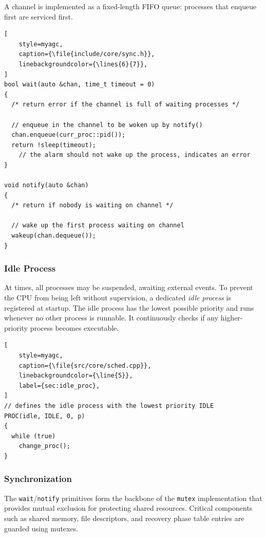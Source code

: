 \begin{itemize}[left=0pt]
        A channel is implemented as a fixed-length FIFO queue: processes that enqueue
        first are serviced first.

\begin{lstlisting}[
    style=myagc,
    caption={\file{include/core/sync.h}},
    linebackgroundcolor={\lines{6}{7}},
]
bool wait(auto &chan, time_t timeout = 0)
{
  /* return error if the channel is full of waiting processes */

  // enqueue in the channel to be woken up by notify()
  chan.enqueue(curr_proc::pid()); 
  return !sleep(timeout); 
    // the alarm should not wake up the process, indicates an error
}

void notify(auto &chan)
{
  /* return if nobody is waiting on channel */

  // wake up the first process waiting on channel
  wakeup(chan.dequeue());
}
\end{lstlisting}
\end{itemize}

\subsubsection{Idle Process}

At times, all processes may be suspended, awaiting external events. To prevent the CPU
from being left without supervision, a dedicated \emph{idle process} is registered at
startup. The idle process has the lowest possible priority and runs whenever no other
process is runnable. It continuously checks if any higher-priority process becomes
executable.

\begin{lstlisting}[
    style=myagc,
    caption={\file{src/core/sched.cpp}},
    linebackgroundcolor={\line{5}},
    label={sec:idle_proc},
]
// defines the idle process with the lowest priority IDLE
PROC(idle, IDLE, 0, p)
{
  while (true) 
    change_proc(); 
}
\end{lstlisting}


\subsubsection{Synchronization}

The \lstinline[style=myagc]|wait|/\lstinline[style=myagc]|notify| primitives form the
backbone of the \lstinline[style=myagc]|mutex| implementation that provides mutual
exclusion for protecting shared resources. Critical components such as shared memory,
file descriptors, and recovery phase table entries are guarded using mutexes.

